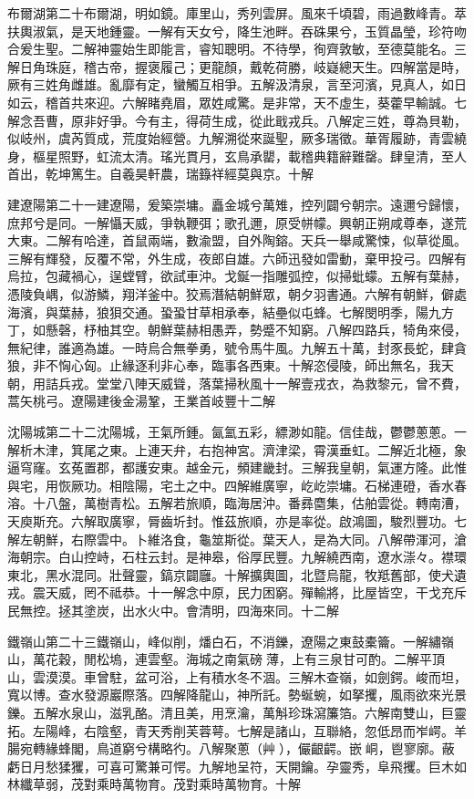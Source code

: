 \begin{pinyinscope}
布爾湖第二十布爾湖，明如鏡。庫里山，秀列雲屏。風來千頃碧，雨過數峰青。萃扶輿淑氣，是天地鍾靈。一解有天女兮，降生池畔。吞硃果兮，玉質晶瑩，珍符吻合爰生聖。二解神靈始生即能言，睿知聰明。不待學，徇齊敦敏，至德莫能名。三解日角珠庭，稽古帝，握褒履己；更龍顏，戴乾荷勝，岐嶷總天生。四解當是時，厥有三姓角雌雄。亂靡有定，蠻觸互相爭。五解汲清泉，言至河濱，見真人，如日如云，稽首共來迎。六解睹堯眉，眾姓咸驚。是非常，天不虛生，葵藿早輸誠。七解念吾曹，原非好爭。今有主，得荷生成，從此戢戎兵。八解定三姓，尊為貝勒，似岐州，虞芮質成，荒度始經營。九解溯從來誕聖，厥多瑞徵。華胥履跡，青雲繞身，樞星照野，虹流太清。瑤光貫月，玄鳥承罌，載稽典籍辭難罄。肆皇清，至人首出，乾坤篤生。自羲昊軒農，瑞籙祥經莫與京。十解

建遼陽第二十一建遼陽，爰築崇墉。矗金城兮萬雉，控列闢兮朝宗。遠邇兮歸懷，庶邦兮是同。一解懾天威，爭執鞭弭；歌孔邇，原受帡幪。興朝正朔咸尊奉，遂荒大東。二解有哈達，首鼠兩端，數渝盟，自外陶鎔。天兵一舉咸驚悚，似草從風。三解有輝發，反覆不常，外生成，夜郎自雄。六師迅發如雷動，棄甲投弓。四解有烏拉，包藏禍心，逞螳臂，欲試車沖。戈鋋一指雕弧控，似掃蚍蠓。五解有葉赫，憑陵負嵎，似游鱗，翔洋釜中。狡焉潛結朝鮮眾，朝夕羽書通。六解有朝鮮，僻處海濱，與葉赫，狼狽交通。蛩蛩甘草相承奉，結壘似屯蜂。七解閔明季，陽九方丁，如懸磬，杼柚其空。朝鮮葉赫相愚弄，勢蹙不知窮。八解四路兵，犄角來侵，無紀律，誰適為雄。一時烏合無拳勇，號令馬牛風。九解五十萬，封豕長蛇，肆貪狼，非不恟心匈。止緣逐利非心奉，臨事各西東。十解恣侵陵，師出無名，我天朝，用詰兵戎。堂堂八陣天威聳，落葉掃秋風十一解壹戎衣，為救黎元，曾不費，蒿矢桃弓。遼陽建後金湯鞏，王業首岐豐十二解

沈陽城第二十二沈陽城，王氣所鍾。氤氳五彩，縹渺如龍。信佳哉，鬱鬱蔥蔥。一解析木津，箕尾之東。上連天弁，右抱神宮。濟津梁，霄漢垂虹。二解近北極，象逼穹窿。玄菟置郡，都護安東。越金元，頻建畿封。三解我皇朝，氣運方隆。此惟與宅，用恢厥功。相陰陽，宅土之中。四解維廣寧，屹屹崇墉。石梯連磴，香水春溶。十八盤，萬樹青松。五解若旅順，臨海居沖。番彞麕集，估舶雲從。轉南漕，天庾斯充。六解取廣寧，脣齒圻封。惟茲旅順，亦是率從。啟鴻圖，駿烈豐功。七解左朝鮮，右際雲中。卜維洛食，龜筮斯從。葉天人，是為大同。八解帶渾河，滄海朝宗。白山控峙，石柱云封。是神皋，俗厚民豐。九解繞西南，遼水漴々。襟環東北，黑水混同。壯聲靈，鎬京闢廱。十解擴輿圖，北暨烏龍，牧羝舊部，使犬遺戎。震天威，罔不祗恭。十一解念中原，民力困窮。殫輸將，比屋皆空，干戈充斥民無控。拯其塗炭，出水火中。會清明，四海來同。十二解

鐵嶺山第二十三鐵嶺山，峰似削，燔白石，不消鑠，遼陽之東鼓橐籥。一解繡嶺山，萬花穀，閒松塢，連雲壑。海城之南氣磅薄，上有三泉甘可酌。二解平頂山，雲漠漠。車曾駐，盆可浴，上有積水冬不涸。三解木查嶺，如劍鍔。峻而坦，寬以博。查水發源巖際落。四解降龍山，神所託。勢蜒蜿，如拏攫，風雨欲來光景鑠。五解水泉山，滋乳酪。清且美，用烹瀹，萬斛珍珠瀉簾箔。六解南雙山，巨靈拓。左陽峰，右陰壑，青天秀削芙蓉萼。七解是諸山，互聯絡，忽低昂而岝崿。羊腸宛轉緣蜂閣，鳥道窮兮構略彴。八解聚蔥（艸），儼齦齶。嵌峒，鬯寥廓。蔽虧日月愁猱玃，可喜可驚兼可愕。九解地呈符，天開鑰。孕靈秀，阜飛攫。巨木如林纖草弱，茂對乘時萬物育。茂對乘時萬物育。十解


\end{pinyinscope}
